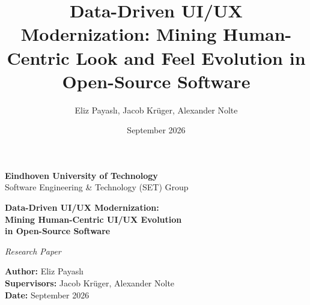 \documentclass{article}
\title{Data-Driven UI/UX Modernization: Mining Human-Centric Look and Feel Evolution in Open-Source Software}
\author{Eliz Payaslı, Jacob Krüger, Alexander Nolte}
\date{September 2026}
\begin{document}
\begin{titlepage}
    \centering
    \vspace*{1.5cm}

    {\Large \textbf{Eindhoven University of Technology}\\[0.3em]
    Software Engineering \& Technology (SET) Group}

    \vspace{2cm}

    {\LARGE \textbf{Data-Driven UI/UX Modernization:\\[0.4em]
    Mining Human-Centric UI/UX Evolution\\[0.4em]
    in Open-Source Software}}

    \vspace{2cm}

    {\large \textit{Research Paper}}

    \vspace{1.5cm}

    {\large
    \textbf{Author:} Eliz Payaslı \\[0.5em]
    \textbf{Supervisors:} Jacob Krüger, Alexander Nolte  \\[0.5em]
    \textbf{Date:} September 2026
    }

    \vspace{2.5cm}


\end{titlepage}
\end{document}
